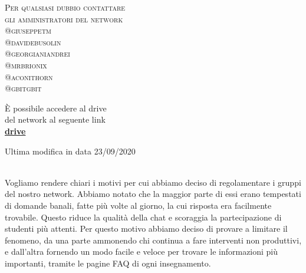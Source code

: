 \documentclass[a4paper, 11pt, oneside, article]{book} %
\begin{document}
\begin{titlepage}
	{  \scshape 
		Per qualsiasi dubbio contattare\\ 
		gli amministratori del network \break \\ 
		@giuseppetm \\ 
		@davidebusolin \\
		@georgianiandrei \\
		@mrbrionix \\
		@aconithorn \\
		@gbitgbit \\
		} %
	
	\vspace{3\baselineskip} %
	
	È possibile accedere al drive \\del network al seguente link\\
	\textbf{\href{https://drive.google.com/drive/folders/0BwzuyD3iLGcbcUNxTVNOVE9FR1E}{drive}}
	
	
	\vfill %
	
	
	{\large Ultima modifica in data 23/09/2020} 

\end{titlepage}



\textcolor{red}{}\\

Vogliamo rendere chiari i motivi per cui abbiamo deciso di regolamentare i gruppi del nostro network.
Abbiamo notato che la maggior parte di essi erano tempestati di domande banali, fatte più volte al giorno, la cui risposta era facilmente trovabile. 
Questo riduce la qualità della chat e scoraggia la partecipazione di studenti più attenti. Per questo motivo abbiamo deciso di provare a limitare il fenomeno, 
da una parte ammonendo chi continua a fare interventi non produttivi, e dall'altra fornendo un modo facile e veloce per trovare le informazioni più importanti, 
tramite le pagine FAQ di ogni insegnamento.\\
\end{document}

